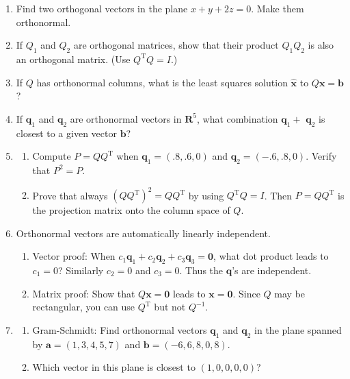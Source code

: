 \documentclass[14pt, a4paper]{article}
\begin{document}
\begin{enumerate}
    \item Find two orthogonal vectors in the plane $x + y + 2z = 0$. Make them orthonormal.

    \item If $Q_1$ and $Q_2$ are orthogonal matrices, show that their product $Q_1 Q_2$ is also an orthogonal matrix. (Use $Q^{\mathrm{T}}Q = I$.)

    \item If $Q$ has orthonormal columns, what is the least squares solution $\widehat{\boldsymbol{x}}$ to $Q\boldsymbol{x} = \boldsymbol{b}$?

    \item If $\boldsymbol{q}_1$ and $\boldsymbol{q}_2$ are orthonormal vectors in $\mathbf{R}^5$, what combination \underline{\hspace{1cm}} $\boldsymbol{q}_1 +$ \underline{\hspace{1cm}} $\boldsymbol{q}_2$ is closest to a given vector $\boldsymbol{b}$?

    \item
          \begin{enumerate}
              \item Compute $P = QQ^{\mathrm{T}}$ when $\boldsymbol{q}_1 = (.8, .6, 0)$ and $\boldsymbol{q}_2 = (-.6, .8, 0)$. Verify that $P^2 = P$.
              \item Prove that always $(QQ^{\mathrm{T}})^2 = QQ^{\mathrm{T}}$ by using $Q^{\mathrm{T}}Q = I$. Then $P = QQ^{\mathrm{T}}$ is the projection matrix onto the column space of $Q$.
          \end{enumerate}

    \item Orthonormal vectors are automatically linearly independent.
          \begin{enumerate}
              \item Vector proof: When $c_1\boldsymbol{q}_1 + c_2\boldsymbol{q}_2 + c_3\boldsymbol{q}_3 = \mathbf{0}$, what dot product leads to $c_1 = 0$? Similarly $c_2 = 0$ and $c_3 = 0$. Thus the $\boldsymbol{q}$'s are independent.
              \item Matrix proof: Show that $Q\boldsymbol{x} = \mathbf{0}$ leads to $\boldsymbol{x} = \mathbf{0}$. Since $Q$ may be rectangular, you can use $Q^{\mathrm{T}}$ but not $Q^{-1}$.
          \end{enumerate}

    \item
          \begin{enumerate}
              \item Gram-Schmidt: Find orthonormal vectors $\boldsymbol{q}_1$ and $\boldsymbol{q}_2$ in the plane spanned by $\boldsymbol{a} = (1, 3, 4, 5, 7)$ and $\boldsymbol{b} = (-6, 6, 8, 0, 8)$.
              \item Which vector in this plane is closest to $(1, 0, 0, 0, 0)$?
          \end{enumerate}


\end{enumerate}
\end{document}
